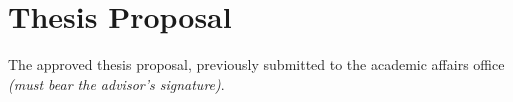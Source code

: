 \chapter*{Thesis Proposal}
\label{proposal}

The approved thesis proposal, previously submitted to the academic affairs office \textit{(must bear the advisor's signature)}.
